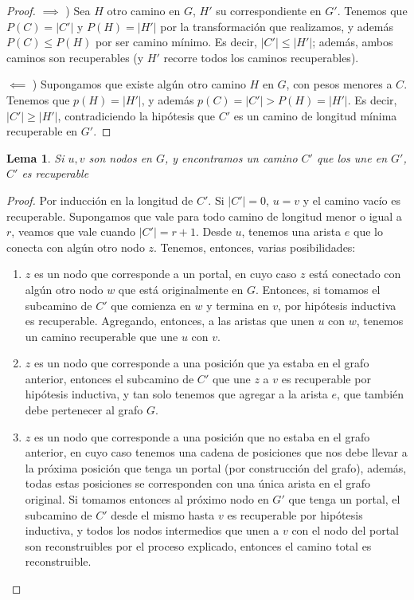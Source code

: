 \documentclass{article}
\newtheorem{lemma}{Lema}[theorem]
\theoremstyle{definition}
\theoremstyle{remark}
\begin{document}
\begin{proof}

$\implies$ ) Sea $H$ otro camino en $G$, $H'$ su correspondiente en $G'$. Tenemos que $P(C) = |C'|$ y $P(H) = |H'|$ por la transformación que realizamos, y además $P(C) \leq P(H)$ por ser camino mínimo. Es decir, $|C'| \leq |H'|$; además, ambos caminos son recuperables (y $H'$ recorre todos los caminos recuperables).

$\impliedby$ ) Supongamos que existe algún otro camino $H$ en $G$, con pesos menores a $C$. Tenemos que $p(H) = |H'|$, y además $p(C) = |C'| > P(H) = |H'|$. Es decir, $|C'| \geq |H'|$, contradiciendo la hipótesis que $C'$ es un camino de longitud mínima recuperable en $G'$.
\end{proof}

\begin{lemma}
Si $u, v$ son nodos en $G$, y encontramos un camino $C'$ que los une en $G'$, $C'$ es recuperable
\end{lemma}

\begin{proof}
Por inducción en la longitud de $C'$. Si $|C'| = 0$, $u = v$ y el camino vacío es recuperable.
Supongamos que vale para todo camino de longitud menor o igual a $r$, veamos que vale cuando $|C'| = r + 1$. Desde $u$, tenemos una arista $e$ que lo conecta con algún otro nodo $z$. Tenemos, entonces, varias posibilidades:

\begin{enumerate}
\item $z$ es un nodo que corresponde a un portal, en cuyo caso $z$ está conectado con algún otro nodo $w$ que está originalmente en $G$. Entonces, si tomamos el subcamino de $C'$ que comienza en $w$ y termina en $v$, por hipótesis inductiva es recuperable. Agregando, entonces, a las aristas que unen $u$ con $w$, tenemos un camino recuperable que une $u$ con $v$.

\item $z$ es un nodo que corresponde a una posición que ya estaba en el grafo anterior, entonces el subcamino de $C'$ que une $z$ a $v$ es recuperable por hipótesis inductiva, y tan solo tenemos que agregar a la arista $e$, que también debe pertenecer al grafo $G$. 

\item $z$ es un nodo que corresponde a una posición que no estaba en el grafo anterior, en cuyo caso tenemos una cadena de posiciones que nos debe llevar a la próxima posición que tenga un portal (por construcción del grafo), además, todas estas posiciones se corresponden con una única arista en el grafo original. Si tomamos entonces al próximo nodo en $G'$ que tenga un portal, el subcamino de $C'$ desde el mismo hasta $v$ es recuperable por hipótesis inductiva, y todos los nodos intermedios que unen a $v$ con el nodo del portal son reconstruibles por el proceso explicado, entonces el camino total es reconstruible.
\end{enumerate}
\end{proof}
\end{document}
